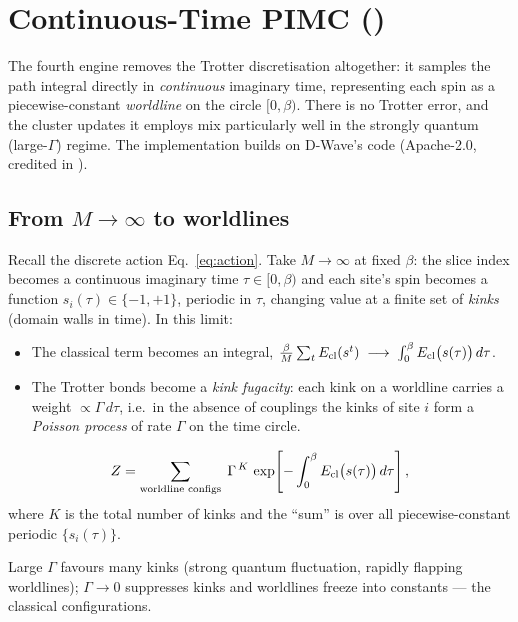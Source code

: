 \chapter{Continuous-Time PIMC ()}
\label{ch:ctpimc}

The fourth engine removes the Trotter discretisation altogether: it samples
the path integral directly in \emph{continuous} imaginary time, representing
each spin as a piecewise-constant \emph{worldline} on the circle
$[0,\beta)$. There is no Trotter error, and the cluster updates it employs
mix particularly well in the strongly quantum (large-$\Gamma$) regime. The
implementation builds on D-Wave's  code (Apache-2.0,
credited in ).

\section{From $M\to\infty$ to worldlines}

Recall the discrete action Eq.~\eqref{eq:action}. Take
$M\to\infty$ at fixed $\beta$: the slice index becomes a continuous
imaginary time $\tau\in[0,\beta)$ and each site's spin becomes a function
$s_i(\tau)\in\{-1,+1\}$, periodic in $\tau$, changing value at a finite set
of \emph{kinks} (domain walls in time). In this limit:

\begin{itemize}
\item The classical term becomes an integral,
$\frac{\beta}{M}\sum_tE_{\mathrm{cl}}(s^t)\;\longrightarrow\;\int_0^\beta
E_{\mathrm{cl}}\bigl(s(\tau)\bigr)\,d\tau$.
\item The Trotter bonds become a \emph{kink fugacity}: each kink on a
worldline carries a weight $\propto\Gamma\,d\tau$, i.e.\ in the absence of
couplings the kinks of site $i$ form a \emph{Poisson process} of rate
$\Gamma$ on the time circle.
\end{itemize}

\begin{keyeq}
\begin{equation}
Z=\sum_{\text{worldline configs}}
\;\Gamma^{\,K}\,
\exp\!\left[-\int_0^\beta E_{\mathrm{cl}}\bigl(s(\tau)\bigr)\,d\tau\right],
\end{equation}
where $K$ is the total number of kinks and the ``sum'' is over all
piecewise-constant periodic $\{s_i(\tau)\}$.
\end{keyeq}

Large $\Gamma$ favours many kinks (strong quantum fluctuation, rapidly
flapping worldlines); $\Gamma\to0$ suppresses kinks and worldlines freeze
into constants --- the classical configurations.

